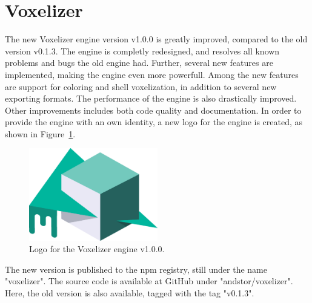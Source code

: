 \section{Voxelizer}
The new Voxelizer engine version v1.0.0 is greatly improved, compared to the old version v0.1.3. The engine is completly redesigned, and resolves all known problems and bugs the old engine had. Further, several new features are implemented, making the engine even more powerfull. Among the new features are support for coloring and shell voxelization, in addition to several new exporting formats. The performance of the engine is also drastically improved. Other improvements includes both code quality and documentation. In order to provide the engine with an own identity, a new logo for the engine is created, as shown in Figure~\ref{fig:voxelizer-logo}.
\begin{figure}[htp]
    \centering
    \includegraphics[width=0.5\textwidth]{sections/result/figures/voxelizer-logo.eps}
    \caption{Logo for the Voxelizer engine v1.0.0.}
    \label{fig:voxelizer-logo}
\end{figure}

The new version is published to the npm registry, still under the name "voxelizer". The source code is available at GitHub under "andstor/voxelizer". Here, the old version is also available, tagged with the tag "v0.1.3".

